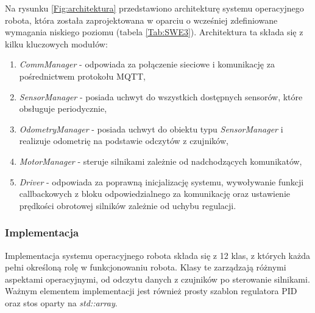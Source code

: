 \documentclass[12pt,twoside]{article}
\begin{document}
Na rysunku \ref{Fig:architektura} przedstawiono architekturę systemu operacyjnego robota, która została zaprojektowana w oparciu o wcześniej zdefiniowane wymagania niskiego poziomu (tabela \ref{Tab:SWE3}). Architektura ta składa się z kilku kluczowych modułów:

\begin{enumerate}[label=\alph*), leftmargin=1.25cm]
	\item \textit{CommManager} - odpowiada za połączenie sieciowe i komunikację za pośrednictwem protokołu MQTT,
	\item \textit{SensorManager} - posiada uchwyt do wszystkich dostępnych sensorów, które obsługuje periodycznie,
	\item \textit{OdometryManager} - posiada uchwyt do obiektu typu \textit{SensorManager} i realizuje odometrię na podstawie odczytów z czujników,
	\item \textit{MotorManager} - steruje silnikami zależnie od nadchodzących komunikatów,
	\item \textit{Driver} - odpowiada za poprawną inicjalizację systemu, wywoływanie funkcji callbackowych z bloku odpowiedzialnego za komunikację oraz ustawienie prędkości obrotowej silników zależnie od uchybu regulacji.  
\end{enumerate}

\subsubsection{Implementacja}
Implementacja systemu operacyjnego robota składa się z 12 klas, z których każda pełni określoną rolę w funkcjonowaniu robota. Klasy te zarządzają różnymi aspektami operacyjnymi, od odczytu danych z czujników po sterowanie silnikami. Ważnym elementem implementacji jest również prosty szablon regulatora PID oraz stos oparty na \textit{std::array}\cite{stdarray}.
\end{document}
